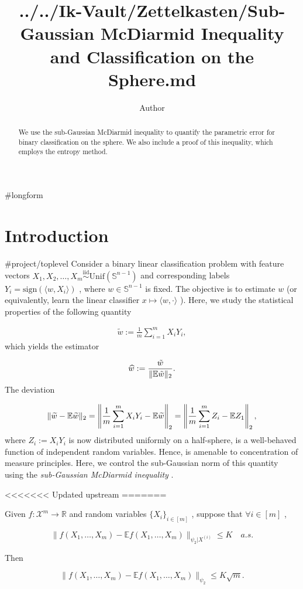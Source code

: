 \documentclass{article}
\title{../../Ik-Vault/Zettelkasten/Sub-Gaussian McDiarmid Inequality and Classification on the Sphere.md}
\author{Author}
\begin{document}
\maketitle
\begin{abstract}
We use the sub-Gaussian McDiarmid inequality to quantify the parametric error for binary classification on the sphere. We also include a proof of this inequality, which employs the entropy method.


\end{abstract}
#longform

\section{Introduction}
\label{section:Introduction}
#project/toplevel 
Consider a binary linear classification problem with feature vectors  $X_1, X_2, \dots, X_m \stackrel{\text{iid}}{\sim} \mathrm{Unif}(\mathbb{S}^{n-1})$  and corresponding labels  $Y_i = \mathrm{sign}(\langle w, X_i \rangle)$ , where  $w \in \mathbb{S}^{n-1}$  is fixed. The objective is to estimate  $w$  (or equivalently, learn the linear classifier  $x \mapsto \langle w, \cdot \rangle$ ). Here, we study the statistical properties of the following quantity

\begin{align}
\widetilde{w} := \frac{1}{m}\sum_{i=1}^m X_i Y_i,
\end{align}
which yields the estimator

\begin{align}
\widehat{w} := \frac{\tilde{w}}{\|\mathbb{E}\tilde{w}\|_{2}}.
\end{align}
The deviation

\begin{align*}
\|\widetilde{w} - \mathbb{E} \widetilde{w}\|_2 = \left\|\frac{1}{m}\sum_{i=1}^m X_i Y_i - \mathbb{E} \widetilde{w}\right\|_2 = \left\|\frac{1}{m}\sum_{i=1}^m Z_i - \mathbb{E} Z_1\right\|_2,
\end{align*}
where  $Z_i := X_i Y_i$  is now distributed uniformly on a half-sphere, is a well-behaved function of independent random variables. Hence, is amenable to concentration of measure principles. Here, we control the sub-Gaussian norm of this quantity using the  \textit{sub-Gaussian McDiarmid inequality}  \cite{maurerConcentrationInequalitiesSubGaussian2021}.


<<<<<<< Updated upstream
=======
\begin{theorem}
\label{Sub-Gaussian McDiarmid}
Given  $f:\mathcal{X}^m \to \mathbb{R}$  and random variables  $\{ X_i \}_{i \in [m]}$ , suppose that  $\forall i \in [m]$ ,


\begin{equation*}
\lVert  f(X_1, \dots, X_m) - \mathbb{E}f(X_1, \dots, X_m)\rVert_{\psi_2|X^{(i)}} \leq K \quad a.s.
\end{equation*}

Then


\begin{equation*}
\lVert f(X_1, \dots, X_m) - \mathbb{E}f(X_1, \dots, X_m)\rVert_{\psi_2} \le K\sqrt{m}.
\end{equation*}


\end{theorem}
\end{document}
